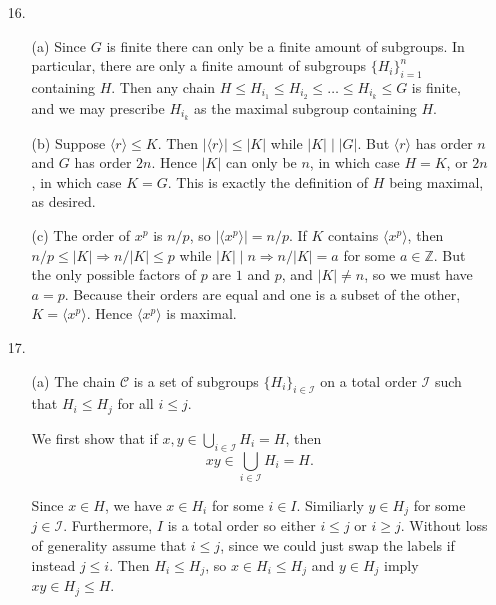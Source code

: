 \documentclass[12pt]{article}
\theoremstyle{remark}
\theoremstyle{named}
\renewcommand{\implies}{\Rightarrow}
\begin{document}
\begin{enumerate}
    \item [16.] 
    \begin{enumerate}
        \item[(a)] Since \(G\) is finite there can only be a finite amount of subgroups. In particular, there are only a finite amount of subgroups \(\{H_i\}_{i = 1}^n\) containing \(H\). Then any chain \(H \le H_{i_1} \le H_{i_2} \le \dots \le H_{i_k} \le G\) is finite, and we may prescribe \(H_{i_k}\) as the maximal subgroup containing \(H\).
        
        \item[(b)] Suppose \(\langle r \rangle \le K\). Then \(|\langle r \rangle| \le |K|\) while \(|K| \mid |G|\). But \(\langle r \rangle\) has order \(n\) and \(G\) has order \(2n\). Hence \(|K|\) can only be \(n\), in which case \(H = K\), or \(2n\), in which case \(K = G\). This is exactly the definition of \(H\) being maximal, as desired.
         
        \item[(c)] The order of \(x^p\) is \(n / p\), so \(|\langle x^p \rangle| = n / p\). If \(K\) contains \(\langle x^p \rangle\), then \(n/p \le |K| \implies n / |K| \le p\) while \(|K| \mid n \implies n / |K| = a\) for some \(a \in \mathbb Z\). But the only possible factors of \(p\) are \(1\) and \(p\), and \(|K| \neq n\), so we must have \(a = p\). Because their orders are equal and one is a subset of the other, \(K = \langle x^p \rangle\). Hence \(\langle x^p \rangle\) is maximal.
    \end{enumerate}
    \item [17.] 
    \begin{enumerate}
        \item[(a)] The chain \(\mathcal C\) is a set of subgroups \(\{H_i\}_{i \in \mathcal I}\) on a total order \(\mathcal I\) such that \(H_i \le H_j\) for all \(i \le j\). 
        
        We first show that if 
        \(x, y \in \bigcup_{i \in \mathcal I} H_i = H\), then \[xy \in \bigcup_{i \in \mathcal I} H_i = H.\]

        Since \(x \in H\), we have \(x \in H_i\) for some \(i \in I\). Similiarly \(y \in H_j\) for some \(j \in \mathcal I\). Furthermore, \(I\) is a total order so either \(i \le j\) or \(i \ge j\). Without loss of generality assume that \(i \le j\), since we could just swap the labels if instead \(j \le i\). Then \(H_i \le H_j\), so \(x \in H_i \le H_j\) and \(y \in H_j\) imply \(xy \in H_j \le H\).


\end{enumerate}
\end{enumerate}
\end{document}
